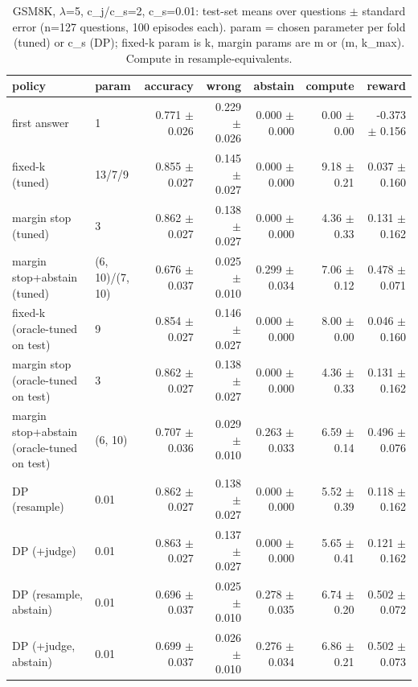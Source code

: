 \begin{table}[t]
\centering
\small
\caption{GSM8K, $\lambda$=5, c\_j/c\_s=2, c\_s=0.01: test-set means over questions $\pm$ standard error (n=127 questions, 100 episodes each). param = chosen parameter per fold (tuned) or c\_s (DP); fixed-k param is k, margin params are m or (m, k\_max). Compute in resample-equivalents.}
\label{tab:headline_gsm8k_lam5_jr2}
\begin{tabular}{llrrrrr}
\toprule
policy & param & accuracy & wrong & abstain & compute & reward \\
\midrule
first answer & 1 & 0.771 $\pm$ 0.026 & 0.229 $\pm$ 0.026 & 0.000 $\pm$ 0.000 & 0.00 $\pm$ 0.00 & -0.373 $\pm$ 0.156 \\
fixed-k (tuned) & 13/7/9 & 0.855 $\pm$ 0.027 & 0.145 $\pm$ 0.027 & 0.000 $\pm$ 0.000 & 9.18 $\pm$ 0.21 & 0.037 $\pm$ 0.160 \\
margin stop (tuned) & 3 & 0.862 $\pm$ 0.027 & 0.138 $\pm$ 0.027 & 0.000 $\pm$ 0.000 & 4.36 $\pm$ 0.33 & 0.131 $\pm$ 0.162 \\
margin stop+abstain (tuned) & (6, 10)/(7, 10) & 0.676 $\pm$ 0.037 & 0.025 $\pm$ 0.010 & 0.299 $\pm$ 0.034 & 7.06 $\pm$ 0.12 & 0.478 $\pm$ 0.071 \\
fixed-k (oracle-tuned on test) & 9 & 0.854 $\pm$ 0.027 & 0.146 $\pm$ 0.027 & 0.000 $\pm$ 0.000 & 8.00 $\pm$ 0.00 & 0.046 $\pm$ 0.160 \\
margin stop (oracle-tuned on test) & 3 & 0.862 $\pm$ 0.027 & 0.138 $\pm$ 0.027 & 0.000 $\pm$ 0.000 & 4.36 $\pm$ 0.33 & 0.131 $\pm$ 0.162 \\
margin stop+abstain (oracle-tuned on test) & (6, 10) & 0.707 $\pm$ 0.036 & 0.029 $\pm$ 0.010 & 0.263 $\pm$ 0.033 & 6.59 $\pm$ 0.14 & 0.496 $\pm$ 0.076 \\
DP (resample) & 0.01 & 0.862 $\pm$ 0.027 & 0.138 $\pm$ 0.027 & 0.000 $\pm$ 0.000 & 5.52 $\pm$ 0.39 & 0.118 $\pm$ 0.162 \\
DP (+judge) & 0.01 & 0.863 $\pm$ 0.027 & 0.137 $\pm$ 0.027 & 0.000 $\pm$ 0.000 & 5.65 $\pm$ 0.41 & 0.121 $\pm$ 0.162 \\
DP (resample, abstain) & 0.01 & 0.696 $\pm$ 0.037 & 0.025 $\pm$ 0.010 & 0.278 $\pm$ 0.035 & 6.74 $\pm$ 0.20 & 0.502 $\pm$ 0.072 \\
DP (+judge, abstain) & 0.01 & 0.699 $\pm$ 0.037 & 0.026 $\pm$ 0.010 & 0.276 $\pm$ 0.034 & 6.86 $\pm$ 0.21 & 0.502 $\pm$ 0.073 \\
\bottomrule
\end{tabular}
\end{table}
